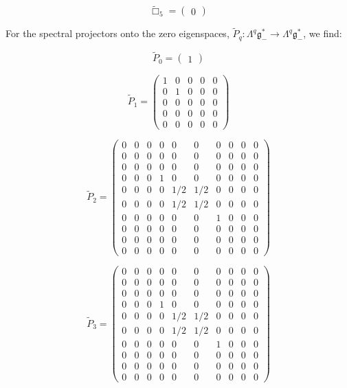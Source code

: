 \documentclass[reqno,12pt]{amsart}
\newcommand\goe{\mathfrak g}
\theoremstyle{plain}
\theoremstyle{definition}
\begin{document}
$$
\tilde\Box_5=\left(\begin{array}{c}
0
\end{array}\right)
$$


For the spectral projectors onto the zero eigenspaces, $\tilde P_q\colon\Lambda^q\goe^*_-\to\Lambda^q\goe^*_-$, we find:

$$
\tilde P_0=\left(\begin{array}{c}
1
\end{array}\right)
$$

$$
\tilde P_1=\left(\begin{array}{cc|c|cc}
1&0&0&0&0\\
0&1&0&0&0\\\hline
0&0&0&0&0\\\hline
0&0&0&0&0\\
0&0&0&0&0
\end{array}\right)
$$

$$
\tilde P_2=\left(\begin{array}{c|cc|cccc|cc|c}
0&0&0&0&0&  0&  0&0&0&0\\\hline
0&0&0&0&0&  0&  0&0&0&0\\
0&0&0&0&0&  0&  0&0&0&0\\\hline
0&0&0&1&0&  0&  0&0&0&0\\
0&0&0&0&1/2&1/2&0&0&0&0\\
0&0&0&0&1/2&1/2&0&0&0&0\\
0&0&0&0&0&  0&  1&0&0&0\\\hline
0&0&0&0&0&  0&  0&0&0&0\\
0&0&0&0&0&  0&  0&0&0&0\\\hline
0&0&0&0&0&  0&  0&0&0&0
\end{array}\right)
$$

$$
\tilde P_3=\left(\begin{array}{c|cc|cccc|cc|c}
0&0&0&0&0&  0&  0&0&0&0\\\hline
0&0&0&0&0&  0&  0&0&0&0\\
0&0&0&0&0&  0&  0&0&0&0\\\hline
0&0&0&1&0&  0&  0&0&0&0\\
0&0&0&0&1/2&1/2&0&0&0&0\\
0&0&0&0&1/2&1/2&0&0&0&0\\
0&0&0&0&0&  0&  1&0&0&0\\\hline
0&0&0&0&0&  0&  0&0&0&0\\
0&0&0&0&0&  0&  0&0&0&0\\\hline
0&0&0&0&0&  0&  0&0&0&0
\end{array}\right)
$$
\end{document}
